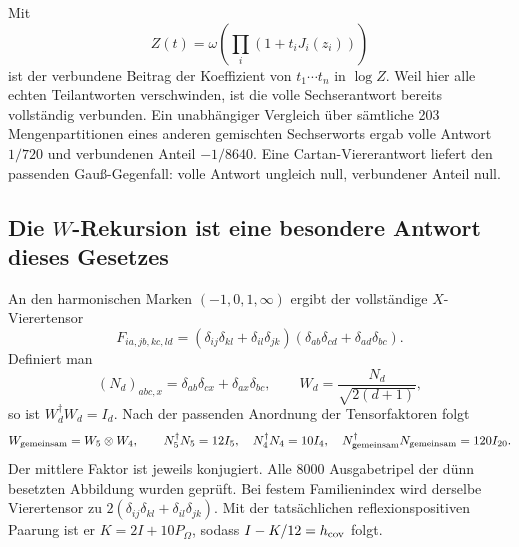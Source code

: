 \begin{center}
\end{center}

Mit
\begin{equation}
Z(t)=\omega\!\left(\prod_i(1+t_iJ_i(z_i))\right)
\end{equation}
ist der verbundene Beitrag der Koeffizient von $t_1\cdots t_n$ in $\log Z$. Weil hier alle echten Teilantworten verschwinden, ist die volle Sechserantwort bereits vollständig verbunden. Ein unabhängiger Vergleich über sämtliche 203 Mengenpartitionen eines anderen gemischten Sechserworts ergab volle Antwort $1/720$ und verbundenen Anteil $-1/8640$. Eine Cartan-Viererantwort liefert den passenden Gauß-Gegenfall: volle Antwort ungleich null, verbundener Anteil null.


\subsection{Die $W$-Rekursion ist eine besondere Antwort dieses Gesetzes}
An den harmonischen Marken $(-1,0,1,\infty)$ ergibt der vollständige $X$-Vierertensor
\begin{equation}
F_{ia,jb,kc,ld}=(\delta_{ij}\delta_{kl}+\delta_{il}\delta_{jk})
(\delta_{ab}\delta_{cd}+\delta_{ad}\delta_{bc}).
\end{equation}
Definiert man
\begin{equation}
(N_d)_{abc,x}=\delta_{ab}\delta_{cx}+\delta_{ax}\delta_{bc},
\qquad W_d=\frac{N_d}{\sqrt{2(d+1)}},
\end{equation}
so ist $W_d^\dagger W_d=I_d$. Nach der passenden Anordnung der Tensorfaktoren folgt
\begin{equation}
W_{\rm gemeinsam}=W_5\otimes W_4,
\qquad N_5^\dagger N_5=12I_5,\quad N_4^\dagger N_4=10I_4,
\quad N_{\rm gemeinsam}^\dagger N_{\rm gemeinsam}=120I_{20}.
\end{equation}
Der mittlere Faktor ist jeweils konjugiert. Alle 8000 Ausgabetripel der dünn besetzten Abbildung wurden geprüft. Bei festem Familienindex wird derselbe Vierertensor zu $2(\delta_{ij}\delta_{kl}+\delta_{il}\delta_{jk})$. Mit der tatsächlichen reflexionspositiven Paarung ist er $K=2I+10P_\Omega$, sodass $I-K/12=h_{\rm cov}$ folgt.

